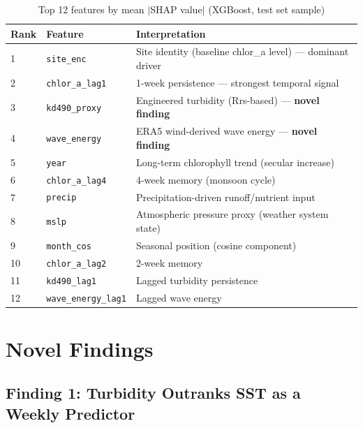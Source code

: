 \documentclass[12pt,a4paper]{report}
\begin{document}
\begin{table}[H]
\centering
\caption{Top 12 features by mean $|$SHAP value$|$ (XGBoost, test set sample)}
\begin{tabular}{C{1cm}L{5cm}L{8cm}}
\toprule
\textbf{Rank} & \textbf{Feature} & \textbf{Interpretation} \\
\midrule
{}
1 & \texttt{site\_enc}     & Site identity (baseline chlor\_a level) — dominant driver \\
2 & \texttt{chlor\_a\_lag1} & 1-week persistence — strongest temporal signal \\
3 & \texttt{kd490\_proxy}  & Engineered turbidity (Rrs-based) — \textbf{novel finding} \\
4 & \texttt{wave\_energy}  & ERA5 wind-derived wave energy — \textbf{novel finding} \\
5 & \texttt{year}          & Long-term chlorophyll trend (secular increase) \\
6 & \texttt{chlor\_a\_lag4} & 4-week memory (monsoon cycle) \\
7 & \texttt{precip}        & Precipitation-driven runoff/nutrient input \\
8 & \texttt{mslp}          & Atmospheric pressure proxy (weather system state) \\
9 & \texttt{month\_cos}    & Seasonal position (cosine component) \\
10 & \texttt{chlor\_a\_lag2} & 2-week memory \\
11 & \texttt{kd490\_lag1}  & Lagged turbidity persistence \\
12 & \texttt{wave\_energy\_lag1} & Lagged wave energy \\
\bottomrule
\end{tabular}
\label{tab:shap}
\end{table}

\section{Novel Findings}
\label{sec:novel_task1}

\subsection*{Finding 1: Turbidity Outranks SST as a Weekly Predictor}
\end{document}
